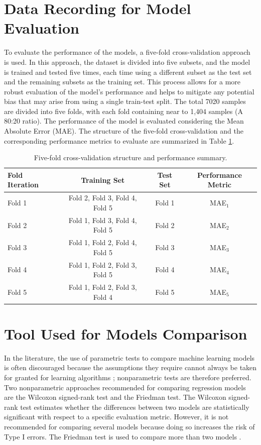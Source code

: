 \section{Data Recording for Model Evaluation}

To evaluate the performance of the models, a five-fold cross-validation approach is used. In this approach, the dataset is divided into five subsets, and the model is trained and tested five times, each time using a different subset as the test set and the remaining subsets as the training set. This process allows for a more robust evaluation of the model's performance and helps to mitigate any potential bias that may arise from using a single train-test split. The total 7020 samples are divided into five folds, with each fold containing near to 1,404 samples (A 80:20 ratio). The performance of the model is evaluated considering the Mean Absolute Error (MAE). The structure of the five-fold cross-validation and the corresponding performance metrics to evaluate are summarized in Table \ref{tab:kfold_structure}. 

\begin{table}[h]
\centering
\begin{tabular}{lccc}
\hline
\textbf{Fold Iteration} & \textbf{Training Set} & \textbf{Test Set} & \textbf{Performance Metric} \\
\hline
Fold 1 & Fold 2, Fold 3, Fold 4, Fold 5 & Fold 1 & MAE$_1$ \\
Fold 2 & Fold 1, Fold 3, Fold 4, Fold 5 & Fold 2 & MAE$_2$ \\
Fold 3 & Fold 1, Fold 2, Fold 4, Fold 5 & Fold 3 & MAE$_3$ \\
Fold 4 & Fold 1, Fold 2, Fold 3, Fold 5 & Fold 4 & MAE$_4$ \\
Fold 5 & Fold 1, Fold 2, Fold 3, Fold 4 & Fold 5 & MAE$_5$ \\
\hline
\end{tabular}
\caption{Five-fold cross-validation structure and performance summary.}
\label{tab:kfold_structure}
\end{table}


\section{Tool Used for Models Comparison}

In the literature, the use of parametric tests to compare machine learning models is often discouraged because the assumptions they require cannot always be taken for granted for learning algorithms \cite{demsar2006statistical}; nonparametric tests are therefore preferred. Two nonparametric approaches recommended for comparing regression models are the Wilcoxon signed-rank test and the Friedman test. The Wilcoxon signed-rank test estimates whether the differences between two models are statistically significant with respect to a specific evaluation metric. However, it is not recommended for comparing several models because doing so increases the risk of Type I errors. The Friedman test is used to compare more than two models \cite{friedmanrecomendation}.

